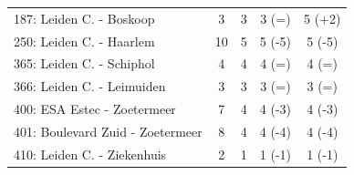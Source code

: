 \begin{table}[h]
\begin{tabular}{l|c|c|c|c}
        187: Leiden C. - Boskoop           & 3       & 3       & 3   (=)      & 5  (+2)          \\
        250: Leiden C. - Haarlem           & 10      & 5       & 5   (-5)     & 5  (-5)          \\
        365: Leiden C. - Schiphol          & 4       & 4       & 4   (=)      & 4  (=)           \\
        366: Leiden C. - Leimuiden         & 3       & 3       & 3   (=)      & 3  (=)           \\
        400: ESA Estec - Zoetermeer        & 7       & 4       & 4   (-3)     & 4  (-3)          \\
        401: Boulevard Zuid - Zoetermeer   & 8       & 4       & 4   (-4)     & 4  (-4)          \\
        410: Leiden C. - Ziekenhuis        & 2       & 1       & 1   (-1)     & 1  (-1)          \\
    \end{tabular}
\end{table}




















































